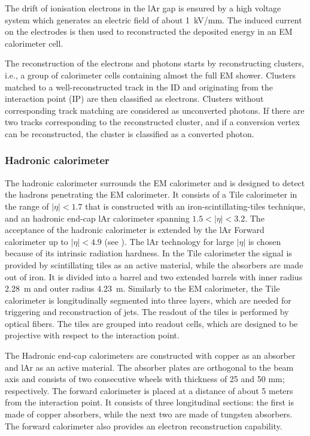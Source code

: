 The drift of ionisation electrons in the lAr gap is ensured by a high voltage system which generates an electric field of about 1~kV/mm. The induced current on the electrodes is then used to reconstructed the deposited energy in an EM calorimeter cell.

The reconstruction of the electrons and photons starts by reconstructing clusters, i.e., a group of calorimeter cells containing almost the full EM shower. Clusters matched to a well-reconstructed track in the ID and originating from the interaction point (IP) are then classified as electrons. Clusters without corresponding track matching are considered as unconverted photons. If there are two tracks corresponding to the reconstructed cluster, and if a conversion vertex can be reconstructed, the cluster is classified as a converted photon.

\subsubsection{Hadronic calorimeter}

The hadronic calorimeter surrounds the EM calorimeter and is designed to detect the hadrons penetrating the EM calorimeter.
It consists of a Tile calorimeter in the range of $|\eta|<1.7$ that is constructed with an iron-scintillating-tiles technique, and an hadronic end-cap lAr calorimeter spanning $1.5<|\eta|<3.2$. The acceptance of the hadronic calorimeter is extended by the lAr Forward calorimeter up to $|\eta|<4.9$ (see ). The lAr technology for large $|\eta|$ is chosen because of its intrinsic radiation hardness.
In the Tile calorimeter the signal is provided by scintillating tiles as an active material, while the absorbers are made out of iron. It is divided into a barrel and two extended barrels with inner radius 2.28~m and outer radius 4.23~m. Similarly to the EM calorimeter, the Tile calorimeter is longitudinally segmented into three layers, which are needed for triggering and reconstruction of jets. The readout of the tiles is performed by optical fibers. The tiles are grouped into readout cells, which are designed to be projective with respect to the interaction point.

The Hadronic end-cap calorimeters are constructed with copper as an absorber and lAr as an active material. The absorber plates are orthogonal to the beam axis and consists of two consecutive wheels
with thickness of 25 and 50 mm; respectively. The forward calorimeter is placed at a distance of about 5 meters from the interaction point. It consists of three longitudinal sections: the first is made of copper absorbers, while the next two are made of tungsten absorbers. The forward calorimeter also provides an electron reconstruction capability.


